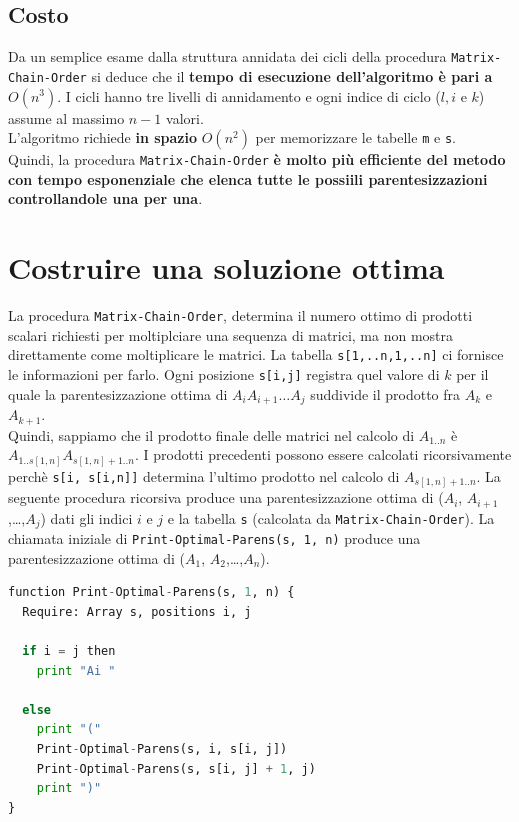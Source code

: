 \subsection{Costo}

Da un semplice esame dalla struttura annidata dei cicli della
procedura \texttt{Matrix-Chain-Order} si deduce che il \textbf{tempo
  di esecuzione dell'algoritmo è pari a} $O(n^3)$. I cicli hanno tre
livelli di annidamento e ogni indice di ciclo ($l,i \text{ e } k$)
assume al massimo $n-1$ valori.\\
L'algoritmo richiede \textbf{in spazio} $O(n^2)$ per memorizzare le
tabelle \texttt{m} e \texttt{s}.\\

Quindi, la procedura \texttt{Matrix-Chain-Order} \textbf{è molto più
  efficiente del metodo con tempo esponenziale che elenca tutte le
  possiili parentesizzazioni controllandole una per una}.


\section{Costruire una soluzione ottima}

La procedura \texttt{Matrix-Chain-Order}, determina il numero ottimo di prodotti
scalari richiesti per moltiplciare una sequenza di matrici, ma non mostra
direttamente come moltiplicare le matrici. La tabella
\texttt{s{[}1,..n,1,..n{]}} ci fornisce le informazioni per farlo. Ogni
posizione \texttt{s{[}i,j{]}} registra quel valore di $k$ per il quale la
parentesizzazione ottima di $A_i A_{i+1}\ldots A_j$ suddivide il prodotto fra
$A_k$ e $A_{k+1}$.\\

Quindi, sappiamo che il prodotto finale delle matrici nel calcolo di
$A_{1..n}$ è \linebreak $A_{1..s[1,n]} A_{s[1,n]+1..n}$. I prodotti precedenti
possono essere calcolati ricorsivamente perchè
\texttt{s{[}i,\ s{[}i,n{]}{]}} determina l'ultimo prodotto nel calcolo
di $A_{s[1,n]+1..n}$. La seguente procedura ricorsiva produce una
parentesizzazione ottima di ($A_i$, $A_{i+1}$,\ldots,$A_j$) dati
gli indici $i$ e $j$ e la tabella \texttt{s} (calcolata da
\texttt{Matrix-Chain-Order}). La chiamata iniziale di
\texttt{Print-Optimal-Parens(s,\ 1,\ n)} produce una parentesizzazione
ottima di ($A_1$, $A_2$,\ldots,$A_n$).\\

\begin{lstlisting}[language=Python, mathescape=true]
function Print-Optimal-Parens(s, 1, n) {
  Require: Array s, positions i, j

  if i = j then
    print "Ai "

  else
    print "("
    Print-Optimal-Parens(s, i, s[i, j])
    Print-Optimal-Parens(s, s[i, j] + 1, j)
    print ")"
}
\end{lstlisting}
\newpage
